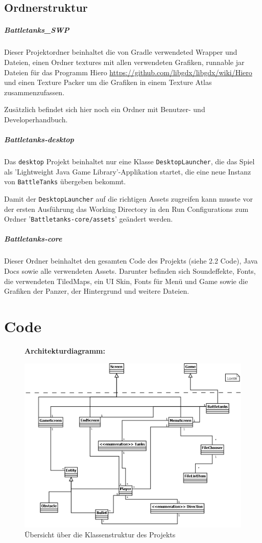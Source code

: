 \documentclass[a4paper]{scrreprt}
\def\code#1{\texttt{#1}}
\begin{document}
\subsection{Ordnerstruktur}
\subparagraph{Battletanks\_SWP} Dieser Projektordner beinhaltet die von Gradle verwendeted Wrapper und Dateien, einen Ordner textures mit allen verwendeten Grafiken, runnable jar Dateien für das Programm Hiero \url{https://github.com/libgdx/libgdx/wiki/Hiero} und einen Texture Packer um die Grafiken in einem Texture Atlas zusammenzufassen.

Zusätzlich befindet sich hier noch ein Ordner mit Benutzer- und Developerhandbuch.

\subparagraph{Battletanks-desktop}
Das  \code{desktop} Projekt beinhaltet nur eine Klasse \code{DesktopLauncher}, die das Spiel als 'Lightweight Java Game Library'-Applikation startet, die eine neue Instanz von \code{BattleTanks} übergeben bekommt.

Damit der \code{DesktopLauncher} auf die richtigen Assets zugreifen kann musste vor der ersten Ausführung das Working Directory in den Run Configurations zum Ordner '\code{Battletanks-core/assets}' geändert werden.

\subparagraph{Battletanks-core}
Dieser Ordner beinhaltet den gesamten Code des Projekts (siehe 2.2 Code), Java Docs sowie alle verwendeten Assets. Darunter befinden sich Soundeffekte, Fonts, die verwendeten TiledMaps, ein UI Skin, Fonts für Menü und Game sowie die Grafiken der Panzer, der Hintergrund und weitere Dateien.



\newpage
\section{Code}
\begin{figure}[H]
  \textbf{Architekturdiagramm:}\par\medskip
  \centering
\includegraphics[width=15cm]{architekturdiagramm.png}
\caption{Übersicht über die Klassenstruktur des Projekts}
\end{figure}
\begin{center}\end{center}
\end{document}
